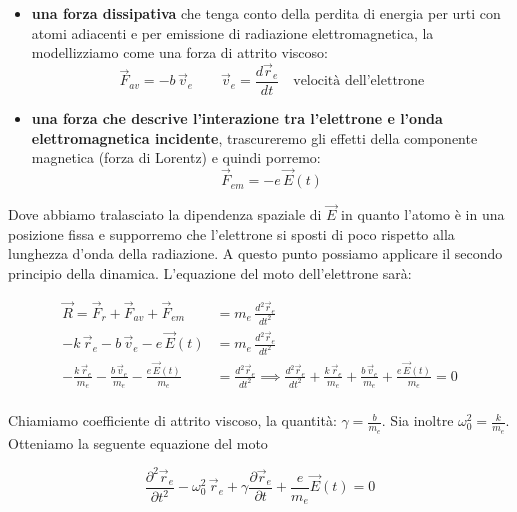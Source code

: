\begin{itemize}
\begin{figure}[htpb]
	\end{figure}
	\FloatBarrier

	\item \textbf{una forza dissipativa} che tenga conto della perdita di energia per urti con atomi adiacenti e per emissione di radiazione elettromagnetica, la modellizziamo come una forza di attrito viscoso:
	\[
		\vec{F}_{av} = -b\,\vec{v}_e \qquad \vec{v}_e=\frac{d\vec{r}_e}{dt} \quad \text{velocità dell'elettrone}
	\]
	\item \textbf{una forza che descrive l'interazione tra l'elettrone e l'onda elettromagnetica incidente}, trascureremo gli effetti della componente magnetica (forza di Lorentz) e quindi porremo:
	\[
		\vec{F}_{em} = -e\,\vec{E} (t)
	\]
\end{itemize}

Dove abbiamo tralasciato la dipendenza spaziale di $\vec{E}$ in quanto l'atomo è in una posizione fissa e supporremo che l'elettrone si sposti di poco rispetto alla lunghezza d'onda della radiazione.
A questo punto possiamo applicare il secondo principio della dinamica. L'equazione del moto dell'elettrone sarà:

\begin{equation*}
	\begin{aligned}
		\vec{R} = \vec{F}_r + \vec{F}_{av} + \vec{F}_{em} &= m_e \, \frac{d^2 \vec{r}_e}{dt^2} \\
		-k\,\vec{r}_e -b\,\vec{v}_e -e\,\vec{E} (t) &= m_e \, \frac{d^2 \vec{r}_e}{dt^2} \\
		-\frac{k\,\vec{r}_e}{m_e} - \frac{b\,\vec{v}_e}{m_e} -\frac{e\,\vec{E} (t)}{m_e} &= \frac{d^2 \vec{r}_e}{dt^2} \implies \frac{d^2 \vec{r}_e}{dt^2} + \frac{k\,\vec{r}_e}{m_e} + \frac{b\,\vec{v}_e}{m_e} + \frac{e\,\vec{E} (t)}{m_e} = 0 \\
	\end{aligned}
\end{equation*}

Chiamiamo coefficiente di attrito viscoso, la quantità: $ \gamma = \frac{b}{m_e} $. Sia inoltre $ \omega_0^2 = \frac{k}{m_e}  $. Otteniamo la seguente equazione del moto

\begin{equation}
	\boxed{\frac{\partial^2 \vec{r}_e}{\partial t^2} -\omega_0^2 \,\vec{r}_e + \gamma \frac{\partial \vec{r}_e}{\partial t} + \frac{e}{m_e}\vec{E} (t) = 0}
	\label{eq:oscillatoreAtomico}
\end{equation}

